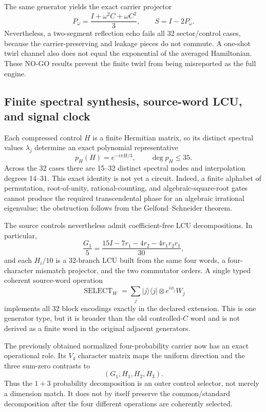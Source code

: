 \documentclass[11pt]{article}
\theoremstyle{definition}
\theoremstyle{remark}
\begin{document}
The same generator yields the exact carrier projector
\begin{equation}
 P_\omega=\frac{I+\omega^2C+\omega C^2}{3},\qquad
 S=I-2P_\omega.
\end{equation}
Nevertheless, a two-segment reflection echo fails all 32 sector/control cases, because the carrier-preserving and leakage pieces do not commute. A one-shot twirl channel also does not equal the exponential of the averaged Hamiltonian. These NO-GO results prevent the finite twirl from being misreported as the full engine.

\subsection{Finite spectral synthesis, source-word LCU, and signal clock}

Each compressed control $H$ is a finite Hermitian matrix, so its distinct spectral values $\lambda_j$ determine an exact polynomial representative
\begin{equation}
 p_H(H)=e^{-i\pi H/3},\qquad \deg p_H\le35.
 \label{eq:spectralpoly091}
\end{equation}
Across the 32 cases there are 15--32 distinct spectral nodes and interpolation degrees 14--31. This exact identity is not yet a circuit. Indeed, a finite alphabet of permutation, root-of-unity, rational-counting, and algebraic-square-root gates cannot produce the required transcendental phase for an algebraic irrational eigenvalue; the obstruction follows from the Gelfond--Schneider theorem.

The source controls nevertheless admit coefficient-free LCU decompositions. In particular,
\begin{equation}
 \frac{G_1}{5}=\frac{15I-7r_1-4r_2-4r_1r_2r_1}{30},
\end{equation}
and each $H_i/10$ is a 32-branch LCU built from the same four words, a four-character mismatch projector, and the two commutator orders. A single typed coherent source-word operation
\begin{equation}
 \operatorname{SELECT}_W=\sum_j |j\rangle\!\langle j|\otimes e^{i\phi_j}W_j
 \end{equation}
implements all 32 block encodings exactly in the declared extension. This is one generator type, but it is broader than the old controlled-$C$ word and is not derived as a finite word in the original adjacent generators.

The previously obtained normalized four-probability carrier now has an exact operational role. Its $V_4$ character matrix maps the uniform direction and the three sum-zero contrasts to
\begin{equation}
 (G_1,H_1,H_2,H_3).
\end{equation}
Thus the $1+3$ probability decomposition is an outer control selector, not merely a dimension match. It does not by itself preserve the common/standard decomposition after the four different operations are coherently selected.
\end{document}
